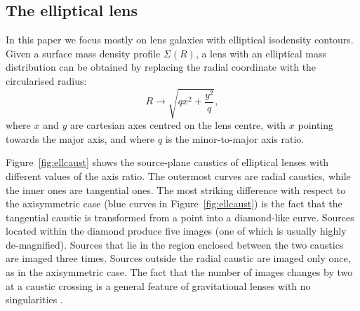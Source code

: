 \documentclass{aa}
\def\Fref#1{Figure~\ref{#1}\xspace}
\begin{document}

\subsection{The elliptical lens}

In this paper we focus mostly on lens galaxies with elliptical isodensity contours.
Given a surface mass density profile $\Sigma(R)$, a lens with an elliptical mass distribution can be obtained by replacing the radial coordinate with the circularised radius:
\begin{equation}\label{eq:elltransf}
R \rightarrow \sqrt{qx^2 + \frac{y^2}{q}},
\end{equation}
where $x$ and $y$ are cartesian axes centred on the lens centre, with $x$ pointing towards the major axis, and where $q$ is the minor-to-major axis ratio.

\Fref{fig:ellcaust} shows the source-plane caustics of elliptical lenses with different values of the axis ratio.
The outermost curves are radial caustics, while the inner ones are tangential ones.
The most striking difference with respect to the axisymmetric case (blue curves in \Fref{fig:ellcaust}) is the fact that the tangential caustic is transformed from a point into a diamond-like curve.
Sources located within the diamond produce five images (one of which is usually highly de-magnified). Sources that lie in the region enclosed between the two caustics are imaged three times. Sources outside the radial caustic are imaged only once, as in the axisymmetric case.
The fact that the number of images changes by two at a caustic crossing is a general feature of gravitational lenses with no singularities \citep{SEF92}.
\end{document}
